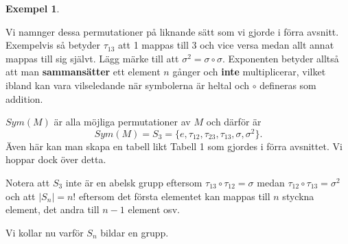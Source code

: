 \documentclass{article}
\theoremstyle{definition}
\newtheorem{exmp}[thm]{Exempel}
\begin{document}
\begin{exmp}
\begin{center}
  \end{center}
  Vi namnger dessa permutationer på liknande sätt som vi gjorde i förra avsnitt. Exempelvis så
  betyder $\tau_{13}$ att 1 mappas till 3 och vice versa medan allt annat mappas till sig självt.
  Lägg märke till att $\sigma^2 = \sigma \circ \sigma.$ Exponenten betyder alltså att man 
  \textbf{sammansätter} ett element $n$ gånger och \textbf{inte} multiplicerar, vilket 
  ibland kan vara vilseledande när symbolerna är heltal och $\circ$ defineras som addition.

  $Sym(M)$ är alla möjliga permutationer av $M$ och därför är 
  \[Sym(M) = S_3 = \{e, \tau_{12}, \tau_{23}, \tau_{13}, \sigma, \sigma^2\}.\]
  Även här kan man skapa en tabell likt Tabell 1 som gjordes i förra avsnittet. Vi hoppar 
  dock över detta. 

  Notera att $S_3$ inte är en abelsk grupp eftersom $\tau_{13} \circ \tau_{12} = \sigma$ medan
  $\tau_{12} \circ \tau_{13} = \sigma^2$ och att $|S_n|= n!$ 
  eftersom det första elementet kan mappas till 
  $n$ styckna element, det andra till $n-1$ element osv.
\end{exmp}
Vi kollar nu varför $S_n$ bildar en grupp.
\end{document}
